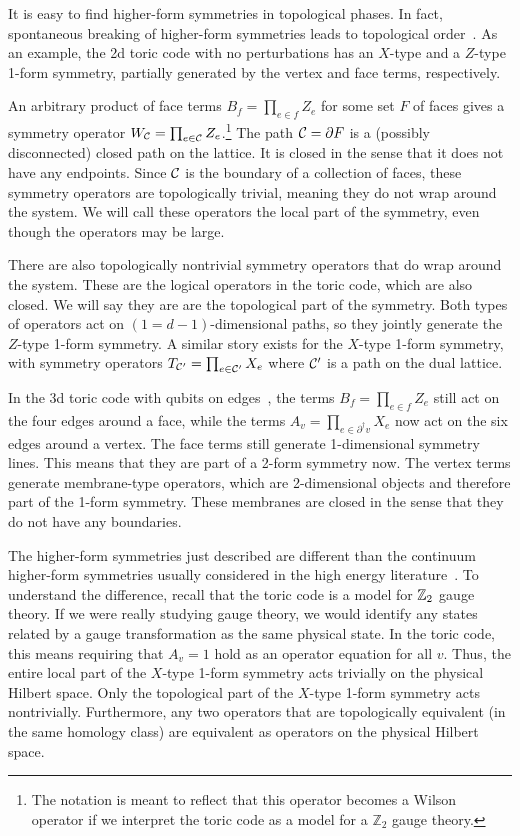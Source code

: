 It is easy to find higher-form symmetries in topological phases. In fact, spontaneous breaking of higher-form symmetries leads to topological order~\cite{Gaiotto2015Generalized, Wen2019Higher}. As an example, the 2d toric code with no perturbations has an $X$-type and a $Z$-type 1-form symmetry, partially generated by the vertex and face terms, respectively.

An arbitrary product of face terms $B_f = \prod_{e \in f} Z_e$ for some set $F$ of faces gives a symmetry operator $W_\cal{C} = \prod_{e \in \cal{C}} Z_e$.\footnote{The notation is meant to reflect that this operator becomes a Wilson operator if we interpret the toric code as a model for a $\mathbb{Z}_2$ gauge theory.} The path $\cal{C} = \partial F$ is a (possibly disconnected) closed path on the lattice. It is closed in the sense that it does not have any endpoints. Since $\cal{C}$ is the boundary of a collection of faces, these symmetry operators are topologically trivial, meaning they do not wrap around the system. We will call these operators the local part of the symmetry, even though the operators may be large.

There are also topologically nontrivial symmetry operators that do wrap around the system. These are the logical operators in the toric code, which are also closed. We will say they are are the topological part of the symmetry. Both types of operators act on $(1=d-1)$-dimensional paths, so they jointly generate the $Z$-type 1-form symmetry. A similar story exists for the $X$-type 1-form symmetry, with symmetry operators $T_{\cal C'} = \prod_{e\in \cal C'}X_e$ where $\cal C'$ is a path on the dual lattice.

In the 3d toric code with qubits on edges~\cite{CastelnovoChamon2008}, the terms $B_f = \prod_{e \in f} Z_e$ still act on the four edges around a face, while the terms $A_v = \prod_{e\in\partial^\dag v} X_e$ now act on the six edges around a vertex.
The face terms still generate 1-dimensional symmetry lines. This means that they are part of a 2-form symmetry now. The vertex terms generate membrane-type operators, which are 2-dimensional objects and therefore part of the 1-form symmetry. These membranes are closed in the sense that they do not have any boundaries.

The higher-form symmetries just described are different than the continuum higher-form symmetries usually considered in the high energy literature~\cite{Seiberg2020Field, Qi2021Exotic}. To understand the difference, recall that the toric code is a model for $\bbZ_2$ gauge theory. If we were really studying gauge theory, we would identify any states related by a gauge transformation as the same physical state. In the toric code, this means requiring that $A_v=1$ hold as an operator equation for all $v$. Thus, the entire local part of the $X$-type 1-form symmetry acts trivially on the physical Hilbert space. Only the topological part of the $X$-type 1-form symmetry acts nontrivially. Furthermore, any two operators that are topologically equivalent (in the same homology class) are equivalent as operators on the physical Hilbert space.

